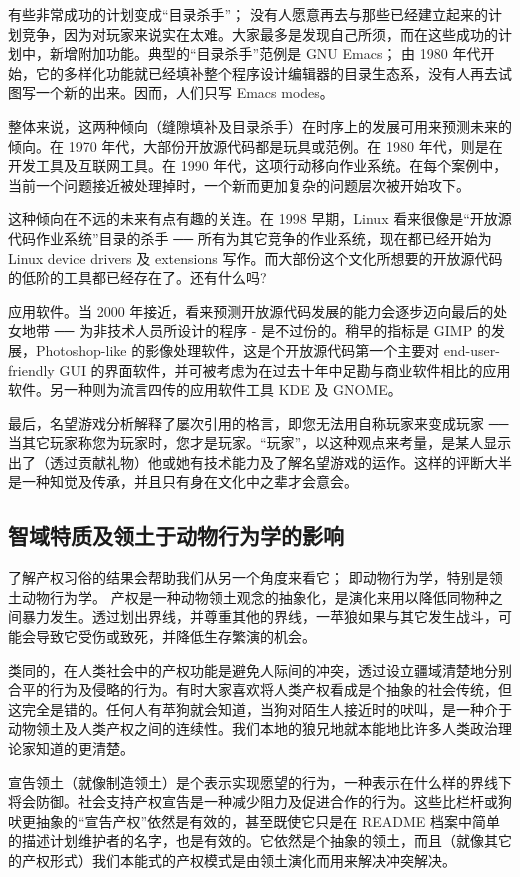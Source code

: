 有些非常成功的计划变成“目录杀手”； 没有人愿意再去与那些已经建立起来的计划竞争，因为对玩家来说实在太难。大家最多是发现自己所须，而在这些成功的计划中，新增附加功能。典型的“目录杀手”范例是 GNU Emacs； 由 1980 年代开始，它的多样化功能就已经填补整个程序设计编辑器的目录生态系，没有人再去试图写一个新的出来。因而，人们只写 Emacs modes。

整体来说，这两种倾向（缝隙填补及目录杀手）在时序上的发展可用来预测未来的倾向。在 1970 年代，大部份开放源代码都是玩具或范例。在 1980 年代，则是在开发工具及互联网工具。在 1990 年代，这项行动移向作业系统。在每个案例中，当前一个问题接近被处理掉时，一个新而更加复杂的问题层次被开始攻下。

这种倾向在不远的未来有点有趣的关连。在 1998 早期，Linux 看来很像是“开放源代码作业系统”目录的杀手  ──  所有为其它竞争的作业系统，现在都已经开始为 Linux device drivers 及 extensions 写作。而大部份这个文化所想要的开放源代码的低阶的工具都已经存在了。还有什么吗?

应用软件。当 2000 年接近，看来预测开放源代码发展的能力会逐步迈向最后的处女地带 ── 为非技术人员所设计的程序 - 是不过份的。稍早的指标是 GIMP 的发展，Photoshop-like 的影像处理软件，这是个开放源代码第一个主要对 end-user-friendly GUI 的界面软件，并可被考虑为在过去十年中足勘与商业软件相比的应用软件。另一种则为流言四传的应用软件工具 KDE 及 GNOME。

最后，名望游戏分析解释了屡次引用的格言，即您无法用自称玩家来变成玩家  ──  当其它玩家称您为玩家时，您才是玩家。“玩家”，以这种观点来考量，是某人显示出了（透过贡献礼物）他或她有技术能力及了解名望游戏的运作。这样的评断大半是一种知觉及传承，并且只有身在文化中之辈才会意会。


\subsection{智域特质及领土于动物行为学的影响}
了解产权习俗的结果会帮助我们从另一个角度来看它； 即动物行为学，特别是领土动物行为学。
产权是一种动物领土观念的抽象化，是演化来用以降低同物种之间暴力发生。透过划出界线，并尊重其他的界线，一苹狼如果与其它发生战斗，可能会导致它受伤或致死，并降低生存繁演的机会。

类同的，在人类社会中的产权功能是避免人际间的冲突，透过设立疆域清楚地分别合平的行为及侵略的行为。有时大家喜欢将人类产权看成是个抽象的社会传统，但这完全是错的。任何人有苹狗就会知道，当狗对陌生人接近时的吠叫，是一种介于动物领土及人类产权之间的连续性。我们本地的狼兄地就本能地比许多人类政治理论家知道的更清楚。

宣告领土（就像制造领土）是个表示实现愿望的行为，一种表示在什么样的界线下将会防御。社会支持产权宣告是一种减少阻力及促进合作的行为。这些比栏杆或狗吠更抽象的“宣告产权”依然是有效的，甚至既使它只是在 README 档案中简单的描述计划维护者的名字，也是有效的。它依然是个抽象的领土，而且（就像其它的产权形式）我们本能式的产权模式是由领土演化而用来解决冲突解决。

